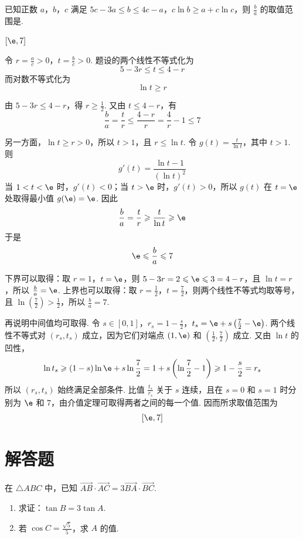 \begin{problem}
已知正数 \(a\)，\(b\)，\(c\) 满足 \(5c-3a \leqslant b \leqslant 4c-a\)，\(c \ln b \geqslant a + c \ln c\)，则 \(\frac{b}{a}\) 的取值范围是\fillinblank{}.
\end{problem}

\begin{answer}
\(\left[\e,7\right]\)
\end{answer}

\begin{solution}
令 \(r=\frac ac>0\)，\(t=\frac bc>0\).
题设的两个线性不等式化为
\[
5-3r\leqslant t\leqslant4-r
\]
而对数不等式化为
\[
\ln t\geqslant r
\]

由 \(5-3r\leqslant4-r\)，得 \(r\geqslant\frac{1}{2}\). 又由 \(t\leqslant4-r\)，有
\[
\frac ba=\frac tr\leqslant\frac{4-r}{r}=\frac4r-1\leqslant7
\]

另一方面，\(\ln t\geqslant r>0\)，所以 \(t>1\)，且 \(r\leqslant\ln t\). 令 \(g(t)=\frac{t}{\ln t}\)，其中 \(t>1\).
则
\[
g'(t)=\frac{\ln t-1}{(\ln t)^2}
\]
当 \(1<t<\e\) 时，\(g'(t)<0\)；当 \(t>\e\) 时，\(g'(t)>0\)，所以 \(g(t)\) 在 \(t=\e\) 处取得最小值 \(g(\e)=\e\). 因此
\[
\frac ba=\frac tr\geqslant\frac{t}{\ln t}\geqslant\e
\]
于是
\[
\e\leqslant\frac ba\leqslant7
\]

下界可以取得：取 \(r=1\)，\(t=\e\)，则 \(5-3r=2\leqslant\e\leqslant3=4-r\)，且 \(\ln t=r\)，所以 \(\frac{b}{a}=\e\). 上界也可以取得：取 \(r=\frac{1}{2}\)，\(t=\frac{7}{2}\)，则两个线性不等式均取等号，且 \(\ln(\frac{7}{2})>\frac{1}{2}\)，所以 \(\frac{b}{a}=7\).

再说明中间值均可取得. 令 \(s\in[0,1]\)，\(r_s=1-\frac{s}{2}\)，\(t_s=\e+s\left(\frac{7}{2}-\e\right)\). 两个线性不等式对 \((r_s,t_s)\) 成立，因为它们对端点 \((1,\e)\) 和 \((\frac{1}{2},\frac{7}{2})\) 成立. 又由 \(\ln t\) 的凹性，
\[
\ln t_s\geqslant(1-s)\ln\e+s\ln\frac{7}{2}=1+s\left(\ln\frac{7}{2}-1\right)\geqslant1-\frac{s}{2}=r_s
\]
所以 \((r_s,t_s)\) 始终满足全部条件. 比值 \(\frac{t_s}{r_s}\) 关于 \(s\) 连续，且在 \(s=0\) 和 \(s=1\) 时分别为 \(\e\) 和 \(7\)，由介值定理可取得两者之间的每一个值. 因而所求取值范围为
\[
\left[\e,7\right]
\]
\end{solution}

\section{解答题}

\begin{problem}
在 \(\triangle ABC\) 中，已知 \(\overrightarrow{AB} \cdot \overrightarrow{AC} = 3\overrightarrow{BA} \cdot \overrightarrow{BC}\).

\begin{enumerate}
\item 求证：\(\tan B = 3\tan A\).
\item 若 \(\cos C = \frac{\sqrt{5}}{5}\)，求 \(A\) 的值.
\end{enumerate}
\end{problem}

